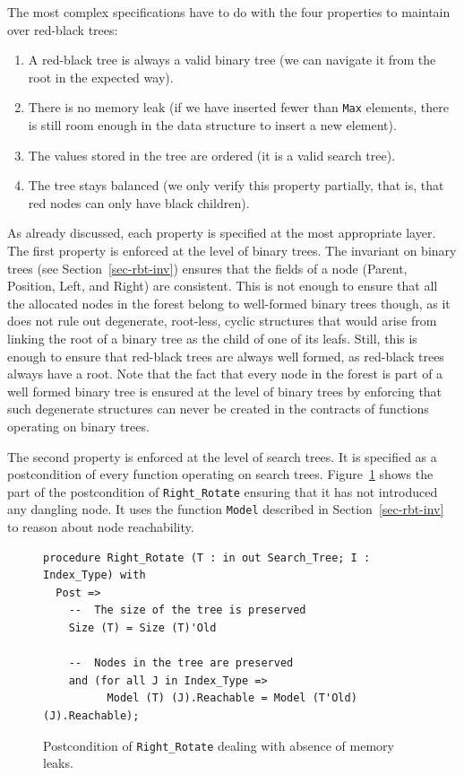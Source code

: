 \documentclass{llncs}
\begin{document}
The most complex specifications have to do with the four properties to maintain
over red-black trees:
\begin{enumerate}
 \item A red-black tree is always a valid binary tree (we can navigate it from
   the root in the expected way).
 \item There is no memory leak (if we have inserted fewer than \texttt{Max}
   elements, there is still room enough in the data structure to insert a new
   element).
 \item The values stored in the tree are ordered (it is a valid search tree).
 \item The tree stays balanced (we only verify this property partially, that is, that red
   nodes can only have black children).
\end{enumerate}

As already discussed, each property is specified at the most appropriate layer.
The first property is enforced at the level of binary trees. The invariant on
binary trees (see Section~\ref{sec-rbt-inv}) ensures that the fields of a node
(Parent, Position, Left, and Right) are consistent. This is not enough to
ensure that all the allocated nodes in the forest belong to well-formed binary
trees though, as it does not rule out degenerate, root-less, cyclic structures
that would arise from linking the root of a binary tree as the child of one of
its leafs. Still, this is enough to ensure that red-black trees are always well
formed, as red-black trees always have a root. Note that the fact that every
node in the forest is part of a well formed binary tree is ensured at the level
of binary trees by enforcing that such degenerate structures can never be
created in the contracts of functions operating on binary trees.

The second property is enforced at the level of search trees. It is specified
as a postcondition of every function operating on search trees.
Figure~\ref{fig-spec-no-leak} shows the part of the postcondition of
\texttt{Right\_Rotate} ensuring that it has not introduced any dangling
node. It uses the function \texttt{Model} described in
Section~\ref{sec-rbt-inv} to reason about node reachability.

\begin{figure}[ht]
\begin{small}
\begin{lstlisting}
procedure Right_Rotate (T : in out Search_Tree; I : Index_Type) with
  Post =>
    --  The size of the tree is preserved
    Size (T) = Size (T)'Old

    --  Nodes in the tree are preserved
    and (for all J in Index_Type =>
          Model (T) (J).Reachable = Model (T'Old) (J).Reachable);
\end{lstlisting}
\end{small}
\caption{\label{fig-spec-no-leak} Postcondition of \texttt{Right\_Rotate} dealing with absence of memory leaks.}
\end{figure}
\end{document}
